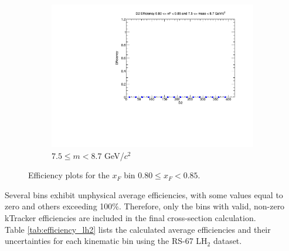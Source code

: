 \documentclass[11pt]{article}
\begin{document}
\begin{figure}[p]
\begin{subfigure}[b]{0.32\textwidth}
        \includegraphics[width=\textwidth]{./kTrackerEfficiencyPlots/D2_Efficiency_xF16_mass10.pdf}
        \caption{$7.5 \leq m < 8.7$ GeV/$c^2$}
    \end{subfigure}
    \caption{Efficiency plots for the $x_F$ bin $0.80 \leq x_F < 0.85$.}
\end{figure}

\clearpage
\FloatBarrier
Several bins exhibit unphysical average efficiencies, with some values equal to zero and others exceeding 100\%. Therefore, only the bins with valid, non-zero kTracker efficiencies are included in the final cross-section calculation.
\\

Table \ref{tab:efficiency_lh2} lists the calculated average efficiencies and their uncertainties for each kinematic bin using the RS-67 LH$_2$ dataset.
\end{document}
